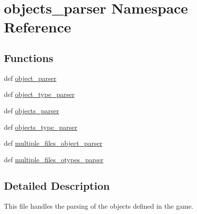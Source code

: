 \hypertarget{namespaceobjects__parser}{\section{objects\-\_\-parser \-Namespace \-Reference}
\label{namespaceobjects__parser}
}
\subsection*{\-Functions}
\begin{DoxyCompactItemize}
\item 
def \hyperlink{namespaceobjects__parser_a644e22cf69be4f9c4d5bdb5391f88704}{object\-\_\-parser}
\item 
def \hyperlink{namespaceobjects__parser_a6db34fdb8d9758d93aebe6d00d83912f}{object\-\_\-type\-\_\-parser}
\item 
def \hyperlink{namespaceobjects__parser_a870c0633694e049ba3cf799697977609}{objects\-\_\-parser}
\item 
def \hyperlink{namespaceobjects__parser_afc8321917c69d971487a5bec30698f6f}{objects\-\_\-type\-\_\-parser}
\item 
def \hyperlink{namespaceobjects__parser_a141baa02fef1e5ae1c4d34dc2cca80e5}{multiple\-\_\-files\-\_\-object\-\_\-parser}
\item 
def \hyperlink{namespaceobjects__parser_a710c35781f427a3320f5c39dfdf5c02a}{multiple\-\_\-files\-\_\-otypes\-\_\-parser}
\end{DoxyCompactItemize}


\subsection{\-Detailed \-Description}
\begin{DoxyVerb}
This file handles the parsing of the objects defined in the game.
\end{DoxyVerb}
 

